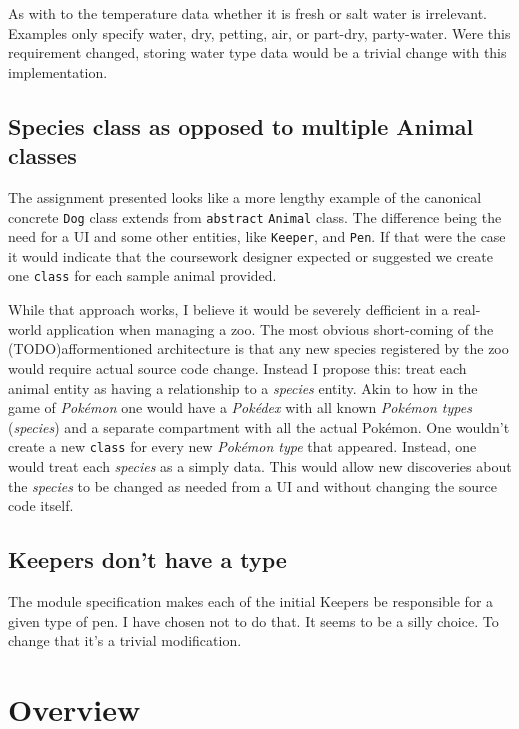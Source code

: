 \documentclass[english,a4paper,]{report}
\begin{document}
As with to the temperature data whether it is fresh or salt water is
irrelevant. Examples only specify water, dry, petting, air, or part-dry,
party-water. Were this requirement changed, storing water type data
would be a trivial change with this implementation.

\hypertarget{species-class-as-opposed-to-multiple-animal-classes}{%
\section{Species class as opposed to multiple Animal
classes}\label{species-class-as-opposed-to-multiple-animal-classes}}

The assignment presented looks like a more lengthy example of the
canonical concrete \texttt{Dog} class extends from \texttt{abstract}
\texttt{Animal} class. The difference being the need for a UI and some
other entities, like \texttt{Keeper}, and \texttt{Pen}. If that were the
case it would indicate that the coursework designer expected or
suggested we create one \texttt{class} for each sample animal provided.

While that approach works, I believe it would be severely defficient in
a real-world application when managing a zoo. The most obvious
short-coming of the (TODO)afformentioned architecture is that any new
species registered by the zoo would require actual source code change.
Instead I propose this: treat each animal entity as having a
relationship to a \emph{species} entity. Akin to how in the game of
\emph{Pokémon} one would have a \emph{Pokédex} with all known
\emph{Pokémon types} (\emph{species}) and a separate compartment with
all the actual Pokémon. One wouldn't create a new \texttt{class} for
every new \emph{Pokémon type} that appeared. Instead, one would treat
each \emph{species} as a simply data. This would allow new discoveries
about the \emph{species} to be changed as needed from a UI and without
changing the source code itself.

\hypertarget{keepers-dont-have-a-type}{%
\section{Keepers don't have a type}\label{keepers-dont-have-a-type}}

The module specification makes each of the initial Keepers be
responsible for a given type of pen. I have chosen not to do that. It
seems to be a silly choice. To change that it's a trivial modification.

\hypertarget{overview}{%
\chapter{Overview}\label{overview}}
\end{document}
